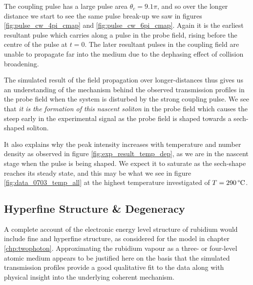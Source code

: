     The coupling pulse has a large pulse area $\theta_c = 9.1 \pi$, and so over
    the longer distance we start to see the same pulse break-up we saw in
    figures \ref{fig:pulse_cw_4pi_cmap} and \ref{fig:pulse_cw_6pi_cmap}. Again
    it is the earliest resultant pulse which carries along a pulse in the probe
    field, rising before the centre of the pulse at $t = 0$. The later resultant
    pulses in the coupling field are unable to propagate far into the medium due
    to the dephasing effect of collision broadening.

    The simulated result of the field propagation over longer-distances thus
    gives us an understanding of the mechanism behind the observed transmission
    profiles in the probe field when the system is disturbed by the strong
    coupling pulse. We see that \textit{it is the formation of this nascent
    soliton} in the probe field which causes the steep early in the experimental
    signal as the probe field is shaped towards a sech-shaped soliton.

    It also explains why the peak intensity increases with temperature and
    number density as observed in figure \ref{fig:exp_result_temp_dep}, as we
    are in the nascent stage when the pulse is being shaped. We expect it to
    saturate as the sech-shape reaches its steady state, and this may be what we
    see in figure \ref{fig:data_0703_temp_all} at the highest temperature
    investigated of $T = \unit[290]{\textrm{\textdegree C}}$.

  \subsection{Hyperfine Structure \& Degeneracy}

    A complete account of the electronic energy level structure of rubidium
    would include fine and hyperfine structure, as considered for the model in
    chapter \ref{chp:twophoton}. Approximating the rubidium vapour as a three-
    or four-level atomic medium appears to be justified here on the basis that
    the simulated transmission profiles provide a good qualitative fit to the
    data along with physical insight into the underlying coherent mechanism.

